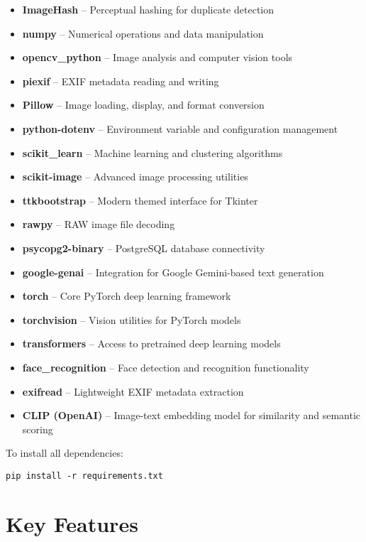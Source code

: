\documentclass[12pt,a4paper]{article}
\begin{document}
\begin{itemize}
    \item \textbf{ImageHash} – Perceptual hashing for duplicate detection
    \item \textbf{numpy} – Numerical operations and data manipulation
    \item \textbf{opencv\_python} – Image analysis and computer vision tools
    \item \textbf{piexif} – EXIF metadata reading and writing
    \item \textbf{Pillow} – Image loading, display, and format conversion
    \item \textbf{python-dotenv} – Environment variable and configuration management
    \item \textbf{scikit\_learn} – Machine learning and clustering algorithms
    \item \textbf{scikit-image} – Advanced image processing utilities
    \item \textbf{ttkbootstrap} – Modern themed interface for Tkinter
    \item \textbf{rawpy} – RAW image file decoding
    \item \textbf{psycopg2-binary} – PostgreSQL database connectivity
    \item \textbf{google-genai} – Integration for Google Gemini-based text generation
    \item \textbf{torch} – Core PyTorch deep learning framework
    \item \textbf{torchvision} – Vision utilities for PyTorch models
    \item \textbf{transformers} – Access to pretrained deep learning models
    \item \textbf{face\_recognition} – Face detection and recognition functionality
    \item \textbf{exifread} – Lightweight EXIF metadata extraction
    \item \textbf{CLIP (OpenAI)} – Image-text embedding model for similarity and semantic scoring
\end{itemize}

To install all dependencies:
\begin{lstlisting}[style=console]
pip install -r requirements.txt
\end{lstlisting}



\section{Key Features}
\end{document}

